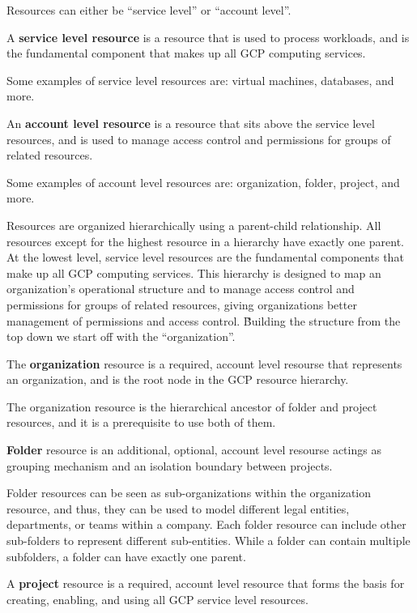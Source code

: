 Resources can either be ``service level'' or ``account level''.

A \textbf{service level resource} is a resource that is used to process workloads, and is the fundamental component
that makes up all GCP computing services.
\ed

\be
Some examples of service level resources are: virtual machines, databases, and more.
\ee

An \textbf{account level resource} is a resource that sits above the service level resources, and is used to manage
access control and permissions for groups of related resources.
\ed

\be
Some examples of account level resources are: organization, folder, project, and more.
\ee

Resources are organized hierarchically using a parent-child relationship. All resources except for the highest resource
in a hierarchy have exactly one parent. At the lowest level, service level resources are the fundamental components
that make up all GCP computing services. This hierarchy is designed to map an organization's operational structure and
to manage access control and permissions for groups of related resources, giving organizations better management of
permissions and access control. \v

Building the structure from the top down we start off with the ``organization''.

\bd[Organization]
The \textbf{organization} resource is a required, account level resourse that represents an organization, and is the
root node in the GCP resource hierarchy.
\ed

The organization resource is the hierarchical ancestor of folder and project resources, and it is a prerequisite to
use both of them.

\bd[Folder]
\textbf{Folder} resource is an additional, optional, account level resourse actings as grouping mechanism and an
isolation boundary between projects.
\ed

Folder resources can be seen as sub-organizations within the organization resource, and thus, they can be used to model
different legal entities, departments, or teams within a company. Each folder resource can include other sub-folders to
represent different sub-entities. While a folder can contain multiple subfolders, a folder can have exactly one parent.

\bd[Project]
A \textbf{project} resource is a required, account level resource that forms the basis for creating, enabling, and
using all GCP service level resources.
\ed

